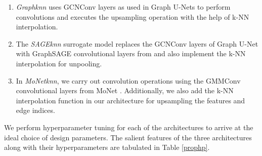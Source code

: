 \begin{enumerate}
    \item \textit{Graphknn} uses GCNConv layers as used in Graph U-Nets to perform convolutions and executes the upsampling operation with the help of k-NN interpolation. 
    \item The \textit{SAGEknn} surrogate model replaces the GCNConv layers of Graph U-Net with GraphSAGE convolutional layers from \cite{SAGE} and also implement the k-NN interpolation for unpooling. 
    \item In \textit{MoNetknn}, we carry out convolution operations using the GMMConv convolutional layers from \gls{MoNet} \cite{MoNet}. Additionally, we also add the k-NN interpolation function in our architecture for upsampling the features and edge indices. 

\end{enumerate}
We perform hyperparameter tuning for each of the architectures to arrive at the ideal choice of design parameters. The salient features of the three architectures along with their hyperparameters are tabulated in Table \ref{prophp}. 
